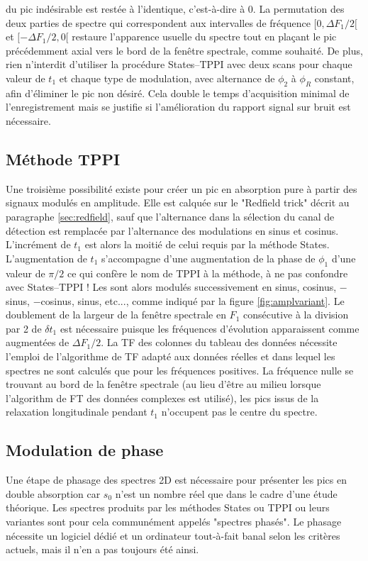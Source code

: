 du pic indésirable est restée à l'identique, c'est-à-dire à 0.
La permutation des deux parties de spectre qui correspondent aux intervalles
de fréquence $[0, \Delta F_1/2[$ et $[-\Delta F_1/2, 0[$ restaure l'apparence usuelle
du spectre tout en plaçant le pic précédemment axial vers le bord de la fenêtre spectrale,
comme souhaité. 
De plus, rien n'interdit d'utiliser la procédure States--TPPI avec deux scans pour
chaque valeur de $t_1$ et chaque type de modulation, avec alternance de $\phi_2$
à $\phi_R$ constant, afin d'éliminer le pic non désiré.
Cela double le temps d'acquisition minimal de l'enregistrement mais se justifie
si l'amélioration du rapport signal sur bruit est nécessaire.

\subsection{Méthode TPPI}
\label{sec:2d:cosy1noyau:tppi}
Une troisième possibilité existe pour créer un pic en absorption pure à partir des signaux
modulés en amplitude.
Elle est calquée sur le "Redfield trick" décrit au paragraphe \ref{sec:redfield}, sauf 
que l'alternance dans la sélection du canal de détection est remplacée par 
l'alternance des modulations en sinus et cosinus.
L'incrément de $t_1$ est alors la moitié de celui requis par la méthode States.
L'augmentation de $t_1$ s'accompagne d'une augmentation de la phase de $\phi_1$ d'une valeur
de $\pi/2$ ce qui confère le nom de TPPI à la méthode, à ne pas confondre avec States--TPPI !
Les {\FID} sont alors modulés successivement en sinus, cosinus, $-$sinus, $-$cosinus, sinus, etc...,
comme indiqué par la figure \ref{fig:amplvariant}.
Le doublement de la largeur de la fenêtre spectrale en $F_1$ consécutive à la division
par 2 de $\delta t_1$ est nécessaire puisque les fréquences d'évolution apparaissent
comme augmentées de $\Delta F_1 / 2$.
La TF des colonnes du tableau des données nécessite l'emploi de l'algorithme de TF
adapté aux données réelles et dans lequel les spectres ne sont calculés
que pour les fréquences positives.
La fréquence nulle se trouvant au bord de la fenêtre spectrale (au lieu d'être
au milieu lorsque l'algorithm de FT des données complexes est utilisé),
les pics issus de la relaxation longitudinale pendant $t_1$ n'occupent pas
le centre du spectre.

\subsection{Modulation de phase}
\label{sec:2d:cosy1noyau:phase}
Une étape de phasage des spectres 2D est nécessaire pour présenter
les pics en double absorption car $s_0$ n'est un nombre réel que dans
le cadre d'une étude théorique. 
Les spectres produits par les méthodes States ou TPPI ou leurs variantes
sont pour cela communément appelés "spectres phasés".
Le phasage nécessite un logiciel dédié et un ordinateur
tout-à-fait banal selon les critères actuels, mais il n'en a pas toujours été ainsi.

